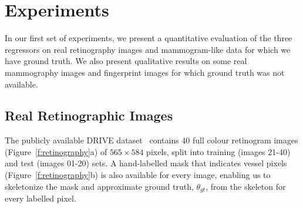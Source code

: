 \documentclass[10pt,twocolumn,letterpaper]{article}
\newcommand{\fref}[1]{Figure~\ref{#1}}
\newcommand{\comment}[1]{}
\begin{document}
\comment{
\item When estimating orientation with a tree (or forest of trees), there is a particular problem when the output is limited to a specific range e.g. (0,2pi]. At the two extremes of the range, samples in the bins near the end are biased toward the centre of the range such that, in our case, it is very unlikely that a 0 or 2pi will be output by the forest.
Random Forests (or trees for that matter) have the option of giving us a multimodal distribution over orientation which will be useful at points where lines cross.
One advantage of the (pruned) tree approach is that each bin contains a number of training samples such that we can estimate a mean value and an uncertainty (variance) for every leaf. In other words, the variance is very much data dependent.
This then propagates in the case of a Random Forest since the individual tree outputs can be combined with their respective variance accounted for correctly.
The output from the Random Forest is always between 0 and 1 in magnitude. Question: should we be taking the square root of the complex vector to halve the angle (and therefore sqrt the magnitude also)? At the moment, vectors are weighed by their unsquared magnitude.
}


\section{Experiments}
\label{s:expts}
In our first set of experiments, we present a quantitative evaluation of the three regressors on real retinography images and mammogram-like data for which we have ground truth. We also present qualitative results on some real mammography images and fingerprint images for which ground truth was not available.
\comment{Are differences statistically significant?}
\comment{Compare with Linop?}
\comment{What if scales are different between training and testing?}

\subsection{Real Retinographic Images}
\label{s:expts_retinography}
The publicly available DRIVE dataset~\cite{Staal_etal_TMI04} contains 40 full colour retinogram images (\fref{f:retinography}a) of $565{\times}584$ pixels, split into training (images 21-40) and test (images 01-20) sets. A hand-labelled mask that indicates vessel pixels (\fref{f:retinography}b) is also available for every image, enabling us to skeletonize the mask and approximate ground truth, $\theta_{gt}$, from the skeleton for every labelled pixel.\comment{It is questionable how well this constitutes ground truth}
\end{document}
